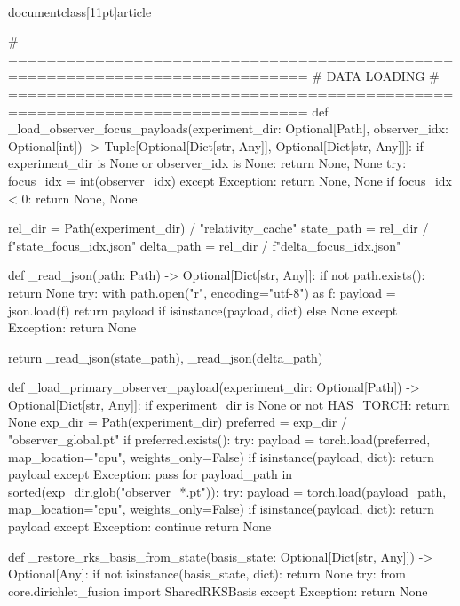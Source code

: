 \\documentclass[11pt]{article}
\begin{document}
\begin{CodeBlock}
# =============================================================================
# DATA LOADING
# =============================================================================
def _load_observer_focus_payloads(experiment_dir: Optional[Path], observer_idx: Optional[int]) -> Tuple[Optional[Dict[str, Any]], Optional[Dict[str, Any]]]:
    if experiment_dir is None or observer_idx is None:
        return None, None
    try:
        focus_idx = int(observer_idx)
    except Exception:
        return None, None
    if focus_idx < 0:
        return None, None

    rel_dir = Path(experiment_dir) / "relativity_cache"
    state_path = rel_dir / f"state_{focus_idx}.json"
    delta_path = rel_dir / f"delta_{focus_idx}.json"

    def _read_json(path: Path) -> Optional[Dict[str, Any]]:
        if not path.exists():
            return None
        try:
            with path.open("r", encoding="utf-8") as f:
                payload = json.load(f)
            return payload if isinstance(payload, dict) else None
        except Exception:
            return None

    return _read_json(state_path), _read_json(delta_path)


def _load_primary_observer_payload(experiment_dir: Optional[Path]) -> Optional[Dict[str, Any]]:
    if experiment_dir is None or not HAS_TORCH:
        return None
    exp_dir = Path(experiment_dir)
    preferred = exp_dir / "observer_global.pt"
    if preferred.exists():
        try:
            payload = torch.load(preferred, map_location="cpu", weights_only=False)
            if isinstance(payload, dict):
                return payload
        except Exception:
            pass
    for payload_path in sorted(exp_dir.glob("observer_*.pt")):
        try:
            payload = torch.load(payload_path, map_location="cpu", weights_only=False)
            if isinstance(payload, dict):
                return payload
        except Exception:
            continue
    return None


def _restore_rks_basis_from_state(basis_state: Optional[Dict[str, Any]]) -> Optional[Any]:
    if not isinstance(basis_state, dict):
        return None
    try:
        from core.dirichlet_fusion import SharedRKSBasis
    except Exception:
        return None


\end{CodeBlock}
\end{document}
